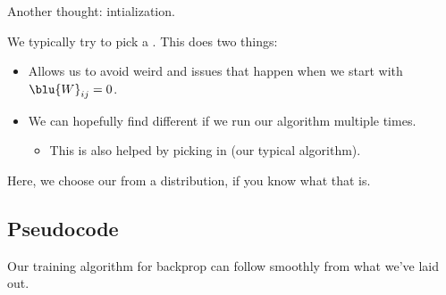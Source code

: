         Another thought: intialization.\\
        
        \begin{concept}
            We typically try to pick a . This does two things:
            
            \begin{itemize}
                \item Allows us to avoid weird  and  issues that happen when we start with $\blu{W}_{ij}=0$.
                
                \item We can hopefully find different  if we run our algorithm multiple times.
                    \begin{itemize}
                        \item This is also helped by picking  in  (our typical algorithm).
                    \end{itemize}
            \end{itemize}
            
            Here, we choose our  from a  distribution, if you know what that is.
        \end{concept}
        

        
    
    \subsection{Pseudocode}
    
        Our training algorithm for backprop can follow smoothly from what we've laid out.
     
